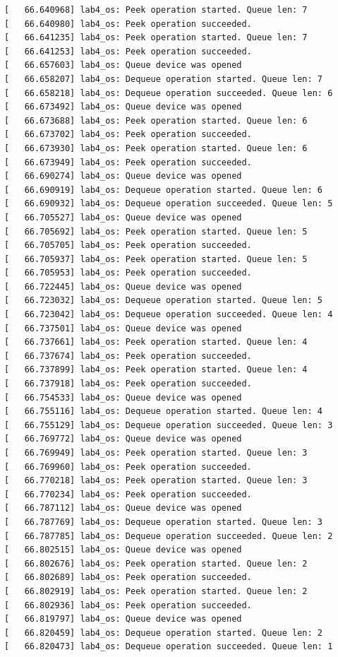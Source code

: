 \documentclass[a4paper,14pt]{extarticle}
\begin{document}
\begin{verbatim}
[   66.640968] lab4_os: Peek operation started. Queue len: 7
[   66.640980] lab4_os: Peek operation succeeded.
[   66.641235] lab4_os: Peek operation started. Queue len: 7
[   66.641253] lab4_os: Peek operation succeeded.
[   66.657603] lab4_os: Queue device was opened
[   66.658207] lab4_os: Dequeue operation started. Queue len: 7
[   66.658218] lab4_os: Dequeue operation succeeded. Queue len: 6
[   66.673492] lab4_os: Queue device was opened
[   66.673688] lab4_os: Peek operation started. Queue len: 6
[   66.673702] lab4_os: Peek operation succeeded.
[   66.673930] lab4_os: Peek operation started. Queue len: 6
[   66.673949] lab4_os: Peek operation succeeded.
[   66.690274] lab4_os: Queue device was opened
[   66.690919] lab4_os: Dequeue operation started. Queue len: 6
[   66.690932] lab4_os: Dequeue operation succeeded. Queue len: 5
[   66.705527] lab4_os: Queue device was opened
[   66.705692] lab4_os: Peek operation started. Queue len: 5
[   66.705705] lab4_os: Peek operation succeeded.
[   66.705937] lab4_os: Peek operation started. Queue len: 5
[   66.705953] lab4_os: Peek operation succeeded.
[   66.722445] lab4_os: Queue device was opened
[   66.723032] lab4_os: Dequeue operation started. Queue len: 5
[   66.723042] lab4_os: Dequeue operation succeeded. Queue len: 4
[   66.737501] lab4_os: Queue device was opened
[   66.737661] lab4_os: Peek operation started. Queue len: 4
[   66.737674] lab4_os: Peek operation succeeded.
[   66.737899] lab4_os: Peek operation started. Queue len: 4
[   66.737918] lab4_os: Peek operation succeeded.
[   66.754533] lab4_os: Queue device was opened
[   66.755116] lab4_os: Dequeue operation started. Queue len: 4
[   66.755129] lab4_os: Dequeue operation succeeded. Queue len: 3
[   66.769772] lab4_os: Queue device was opened
[   66.769949] lab4_os: Peek operation started. Queue len: 3
[   66.769960] lab4_os: Peek operation succeeded.
[   66.770218] lab4_os: Peek operation started. Queue len: 3
[   66.770234] lab4_os: Peek operation succeeded.
[   66.787112] lab4_os: Queue device was opened
[   66.787769] lab4_os: Dequeue operation started. Queue len: 3
[   66.787785] lab4_os: Dequeue operation succeeded. Queue len: 2
[   66.802515] lab4_os: Queue device was opened
[   66.802676] lab4_os: Peek operation started. Queue len: 2
[   66.802689] lab4_os: Peek operation succeeded.
[   66.802919] lab4_os: Peek operation started. Queue len: 2
[   66.802936] lab4_os: Peek operation succeeded.
[   66.819797] lab4_os: Queue device was opened
[   66.820459] lab4_os: Dequeue operation started. Queue len: 2
[   66.820473] lab4_os: Dequeue operation succeeded. Queue len: 1

\end{verbatim}
\end{document}
